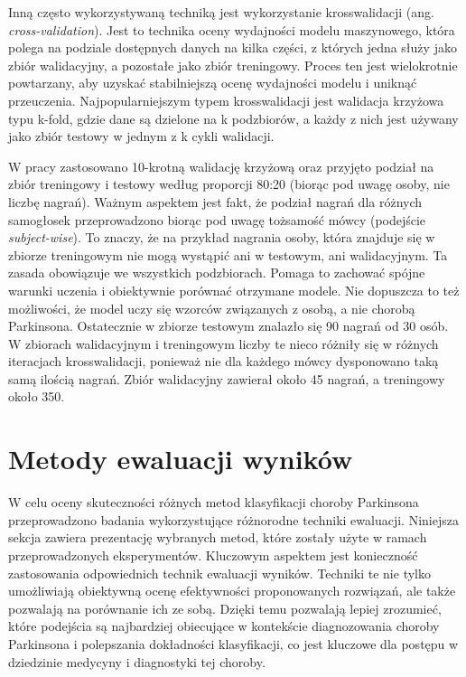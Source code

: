 Inną często wykorzystywaną techniką jest wykorzystanie krosswalidacji (ang. \emph{cross-validation}).
Jest to technika oceny wydajności modelu maszynowego, która polega na podziale dostępnych danych na kilka części, z których jedna służy jako zbiór walidacyjny, a pozostałe jako zbiór treningowy.
Proces ten jest wielokrotnie powtarzany, aby uzyskać stabilniejszą ocenę wydajności modelu i uniknąć przeuczenia.
Najpopularniejszym typem krosswalidacji jest walidacja krzyżowa typu k-fold, gdzie dane są dzielone na k podzbiorów, a każdy z nich jest używany jako zbiór testowy w jednym z k cykli walidacji.

W pracy zastosowano 10-krotną walidację krzyżową oraz przyjęto podział na zbiór treningowy i testowy według proporcji 80:20 (biorąc pod uwagę osoby, nie liczbę nagrań).
Ważnym aspektem jest fakt, że podział nagrań dla różnych samogłosek przeprowadzono biorąc pod uwagę tożsamość mówcy (podejście \emph{subject-wise}).
To znaczy, że na przykład nagrania osoby, która znajduje się w zbiorze treningowym nie mogą wystąpić ani w testowym, ani walidacyjnym.
Ta zasada obowiązuje we wszystkich podzbiorach.
Pomaga to zachować spójne warunki uczenia i obiektywnie porównać otrzymane modele.
Nie dopuszcza to też możliwości, że model uczy się wzorców związanych z osobą, a nie chorobą Parkinsona.
Ostatecznie w zbiorze testowym znalazło się 90 nagrań od 30 osób.
W zbiorach walidacyjnym i treningowym liczby te nieco różniły się w różnych iteracjach krosswalidacji, ponieważ nie dla każdego mówcy dysponowano taką samą ilością nagrań.
Zbiór walidacyjny zawierał około 45 nagrań, a treningowy około 350.


\section{Metody ewaluacji wyników}
\label{sec:metody-ewaluacji-wynikow}

W celu oceny skuteczności różnych metod klasyfikacji choroby Parkinsona przeprowadzono badania wykorzystujące różnorodne techniki ewaluacji.
Niniejsza sekcja zawiera prezentację wybranych metod, które zostały użyte w ramach przeprowadzonych eksperymentów.
Kluczowym aspektem jest konieczność zastosowania odpowiednich technik ewaluacji wyników.
Techniki te nie tylko umożliwiają obiektywną ocenę efektywności proponowanych rozwiązań, ale także pozwalają na porównanie ich ze sobą.
Dzięki temu pozwalają lepiej zrozumieć, które podejścia są najbardziej obiecujące w kontekście diagnozowania choroby Parkinsona i polepszania dokładności klasyfikacji, co jest kluczowe dla postępu w dziedzinie medycyny i diagnostyki tej choroby.

